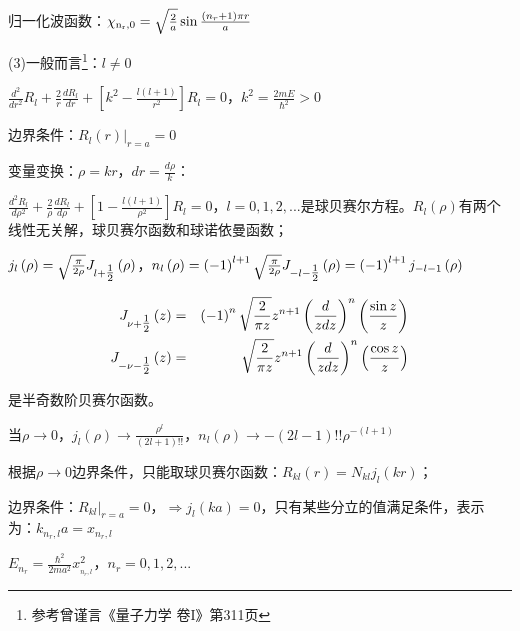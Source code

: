 归一化波函数：$\chi _{{\rm{n}}_{\rm{r}} ,0}  = \sqrt {\frac{2}{a}} \sin \frac{{\left( {n_r  + 1} \right)\pi r}}{a}$

(3)一般而言\footnote{参考曾谨言《量子力学 卷I》第311页}：$l \ne 0$

$\frac{{d^2 }}{{dr^2 }}R_l  + \frac{2}{r}\frac{{dR_l }}{{dr}} + \left[ {k^2  - \frac{{l\left( {l + 1} \right)}}{{r^2 }}} \right]R_l  = 0$，$k^2  = \frac{{2mE}}{{\hbar ^2 }} > 0$

边界条件：$\left. {R_l \left( r \right)} \right|_{r = a}  = 0$

变量变换：$\rho  = kr$，$dr = \frac{{d\rho }}{k}$：

$\frac{{d^2 R_l }}{{d\rho ^2 }} + \frac{2}{\rho }\frac{{dR_l }}{{d\rho }} + \left[ {1 - \frac{{l\left( {l + 1} \right)}}{{\rho ^2 }}} \right]R_l  = 0$，$l = 0,1,2,...$是球贝赛尔方程。$R_l \left( \rho  \right)$有两个线性无关解，球贝赛尔函数和球诺依曼函数；

$j_l \left( \rho  \right) = \sqrt {\frac{\pi }{{2\rho }}} J_{l + {\textstyle{1 \over 2}}} \left( \rho  \right)$，$n_l \left( \rho  \right) = \left( { - 1} \right)^{l + 1} \sqrt {\frac{\pi }{{2\rho }}} J_{ - l - {\textstyle{1 \over 2}}} \left( \rho  \right) = \left( { - 1} \right)^{l + 1} j_{ - l - 1} \left( \rho  \right)$

\begin{eqnarray*}
J_{\nu  + {\textstyle{1 \over 2}}} \left( z \right) & = & \left( { - 1} \right)^n \sqrt {\frac{2}{{\pi z}}} z^{n + 1} \left( {\frac{d}{{zdz}}} \right)^n \left( {\frac{{\sin z}}{z}} \right) \\
J_{ - \nu  - {\textstyle{1 \over 2}}} \left( z \right) & = & \sqrt {\frac{2}{{\pi z}}} z^{n + 1} \left( {\frac{d}{{zdz}}} \right)^n \left( {\frac{{\cos z}}{z}} \right)
\end{eqnarray*}

是半奇数阶贝赛尔函数。

当$\rho  \to 0$，$j_l \left( \rho  \right) \to \frac{{\rho ^l }}{{\left( {2l + 1} \right)!!}}$，$n_l \left( \rho  \right) \to  - \left( {2l - 1} \right)!!\rho ^{ - (l + 1)} $

根据$\rho  \to 0$边界条件，只能取球贝赛尔函数：$R_{kl} \left( r \right) = N_{kl} j_l (kr)$；


边界条件：$\left. {R_{kl} } \right|_{r = a}  = 0$，$\Rightarrow j_l (ka) = 0$，只有某些分立的值满足条件，表示为：$k_{n_r ,l} a = x_{n_r ,l} $

$E_{n_r }  = \frac{{\hbar ^2 }}{{2ma^2 }}x_{_{n_r ,l} }^2 $，$n_r  = 0,1,2,...$


